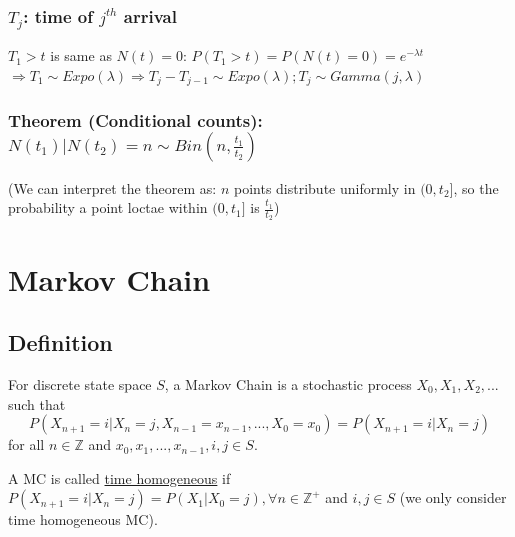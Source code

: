 \documentclass[11pt]{elegantbook}
\begin{document}
\subsection{$T_j$: time of $j^{th}$ arrival}
$T_1>t$ is same as $N(t)=0$: $P(T_1>t)=P(N(t)=0)=e^{-\lambda t}$\\
$\Rightarrow T_1\sim Expo(\lambda) \Rightarrow T_j-T_{j-1}\sim Expo(\lambda); T_j\sim Gamma(j,\lambda)$

\subsection{Theorem (Conditional counts): $N(t_1)|N(t_2)=n\sim Bin(n,\frac{t_1}{t_2})$}
(We can interpret the theorem as: $n$ points distribute uniformly in $(0,t_2]$, so the probability a point loctae within $(0,t_1]$ is $\frac{t_1}{t_2}$)
















































\chapter{Markov Chain}
\section{Definition}
For discrete state space $S$, a Markov Chain is a stochastic process $X_0,X_1,X_2,...$ such that
$$P(X_{n+1}=i|X_n=j,X_{n-1}=x_{n-1},...,X_0=x_0)=P(X_{n+1}=i|X_n=j)$$
for all $n\in \mathbb{Z}$ and $x_0,x_1,...,x_{n-1},i,j\in S$.

A MC is called \underline{time homogeneous} if $P(X_{n+1}=i|X_n=j)=P(X_1|X_0=j),\forall n\in \mathbb{Z}^+$ and $i,j\in S$ (we only consider time homogeneous MC).
\end{document}
